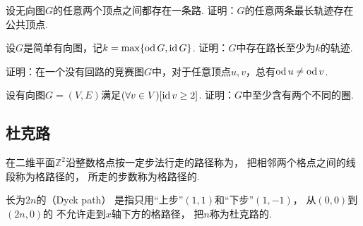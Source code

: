 \begin{example}
设无向图\(G\)的任意两个顶点之间都存在一条路.
证明：\(G\)的任意两条最长轨迹存在公共顶点.
\end{example}

\begin{example}
设\(G\)是简单有向图，记\(k = \max\{\operatorname{od} G,\operatorname{id} G\}\).
证明：\(G\)中存在路长至少为\(k\)的轨迹.
\end{example}

\begin{example}
证明：在一个没有回路的竞赛图\(G\)中，对于任意顶点\(u,v\)，总有\(\operatorname{od} u \neq \operatorname{od} v\).
\end{example}

\begin{example}
设有向图\(G = (V,E)\)满足\((\forall v \in V)[\operatorname{id} v \geq 2]\).
证明：\(G\)中至少含有两个不同的圈.
\end{example}

\subsection{杜克路}
\begin{definition}
在二维平面\(\mathbb{Z}^2\)沿整数格点按一定步法行走的路径称为，
把相邻两个格点之间的线段称为格路径的，
所走的步数称为格路径的.
\end{definition}
\begin{definition}
长为\(2n\)的（Dyck path）
是指只用“上步”\((1,1)\)和“下步”\((1,-1)\)，
从\((0,0)\)到\((2n,0)\)的
不允许走到\(x\)轴下方的格路径，
把\(n\)称为杜克路的.
\end{definition}

